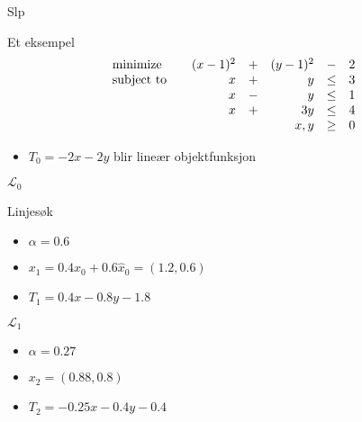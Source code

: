 \documentclass{beamer}
\begin{document}
\begin{frame}{Slp}

\end{frame}



\begin{frame}{Et eksempel}
\[
\begin{array}{lcrcrcl}
\textrm{minimize}           & &   (x-1)^2 &+&   (y-1)^2 & - &  2 \\
\textrm{subject to}         & &         x &+&         y &\leq& 3 \\
                            & &         x &-&         y &\leq& 1 \\
                            & &         x &+&       3 y &\leq& 4 \\
                 \multicolumn{5}{r}{x,y}                &\geq& 0
\end{array}
\]
\begin{itemize}
\item $T_0 = -2 x - 2 y$ blir lineær objektfunksjon
\end{itemize}
\end{frame}



\begin{frame}{$\mathcal{L}_0$}
\begin{center}

\end{center}
\end{frame}



\begin{frame}{Linjesøk}
\begin{center}

\end{center}
\begin{itemize}
\item $\alpha = 0.6$
\item $x_1 = 0.4x_0 + 0.6 \hat{x}_0 = (1.2, 0.6)$
\item $T_1 = 0.4x - 0.8y - 1.8$
\end{itemize}
\end{frame}




\begin{frame}{$\mathcal{L}_1$}
\begin{center}

\end{center}
\begin{itemize}
\item $\alpha = 0.27$
\item $x_2 = (0.88, 0.8)$
\item $T_2 = -0.25x - 0.4y - 0.4$
\end{itemize}
\end{frame}
\end{document}
